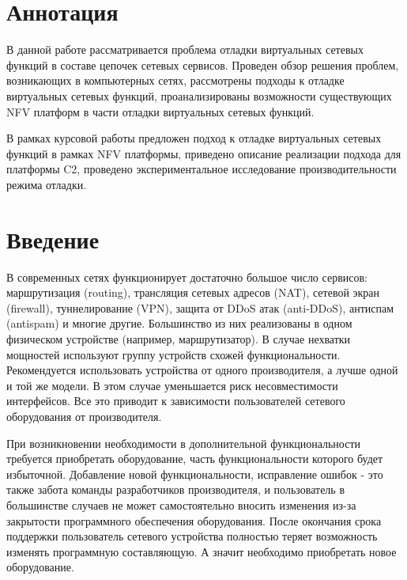\documentclass[oneside,final,14pt,a4paper]{extreport}
\begin{document}
\chapter*{Аннотация}
В данной работе рассматривается проблема отладки виртуальных сетевых функций в составе цепочек сетевых сервисов. Проведен обзор решения проблем, возникающих в компьютерных сетях, рассмотрены подходы к отладке виртуальных сетевых функций, проанализированы возможности существующих NFV платформ в части отладки виртуальных сетевых функций.

В рамках курсовой работы предложен подход к отладке виртуальных сетевых функций в рамках NFV платформы, приведено описание реализации подхода для платформы C2, проведено экспериментальное исследование производительности режима отладки.





\tableofcontents %





\chapter*{Введение}

В современных сетях функционирует достаточно большое  число сервисов: маршрутизация (routing), трансляция сетевых адресов (NAT), сетевой экран (firewall), туннелирование (VPN), защита от DDoS атак (anti-DDoS), антиспам (antispam) и многие другие. Большинство из них реализованы в одном физическом устройстве (например, маршрутизатор). В случае нехватки мощностей используют группу устройств схожей функциональности. Рекомендуется использовать устройства от одного производителя, а лучше одной и той же модели. В этом случае уменьшается риск несовместимости интерфейсов. Все это приводит к зависимости пользователей сетевого оборудования от производителя.

При возникновении необходимости в дополнительной функциональности требуется приобретать оборудование, часть функциональности которого будет избыточной. Добавление новой функциональности, исправление ошибок - это также забота команды разработчиков производителя, и пользователь в большинстве случаев не может самостоятельно вносить изменения из-за закрытости программного обеспечения оборудования. После окончания срока поддержки пользователь сетевого устройства полностью теряет возможность изменять программную составляющую. А значит необходимо приобретать новое оборудование.
\end{document}

